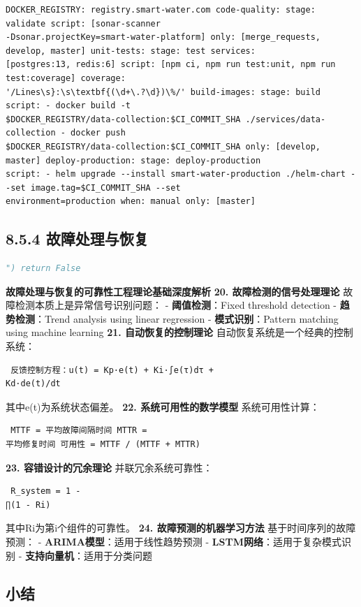 {\begin{lstlisting}
DOCKER_REGISTRY: registry.smart-water.com code-quality: stage: validate script: [sonar-scanner
-Dsonar.projectKey=smart-water-platform] only: [merge_requests, develop, master] unit-tests: stage: test services:
[postgres:13, redis:6] script: [npm ci, npm run test:unit, npm run test:coverage] coverage:
'/Lines\s}:\s\textbf{(\d+\.?\d})\%/' build-images: stage: build script: - docker build -t
$DOCKER_REGISTRY/data-collection:$CI_COMMIT_SHA ./services/data-collection - docker push
$DOCKER_REGISTRY/data-collection:$CI_COMMIT_SHA only: [develop, master] deploy-production: stage: deploy-production
script: - helm upgrade --install smart-water-production ./helm-chart --set image.tag=$CI_COMMIT_SHA --set
environment=production when: manual only: [master] \end{lstlisting} \subsection{8.5.4
故障处理与恢复}\label{ux6545ux969cux5904ux7406ux4e0eux6062ux590d} \begin{lstlisting}[language=Python] ") return False
\end{lstlisting} \textbf{故障处理与恢复的可靠性工程理论基础深度解析} \textbf{20. 故障检测的信号处理理论} 故障检测本质上是异常信号识别问题： - \textbf{阈值检测}：Fixed
threshold detection - \textbf{趋势检测}：Trend analysis using linear regression - \textbf{模式识别}：Pattern matching using
machine learning \textbf{21. 自动恢复的控制理论} 自动恢复系统是一个经典的控制系统： \begin{lstlisting} 反馈控制方程：u(t) = Kp·e(t) + Ki·∫e(τ)dτ +
Kd·de(t)/dt \end{lstlisting} 其中e(t)为系统状态偏差。 \textbf{22. 系统可用性的数学模型} 系统可用性计算： \begin{lstlisting} MTTF = 平均故障间隔时间 MTTR =
平均修复时间 可用性 = MTTF / (MTTF + MTTR) \end{lstlisting} \textbf{23. 容错设计的冗余理论} 并联冗余系统可靠性： \begin{lstlisting} R_system = 1 -
∏(1 - Ri) \end{lstlisting} 其中Ri为第i个组件的可靠性。 \textbf{24. 故障预测的机器学习方法} 基于时间序列的故障预测： - \textbf{ARIMA模型}：适用于线性趋势预测 -
\textbf{LSTM网络}：适用于复杂模式识别 - \textbf{支持向量机}：适用于分类问题 \subsection{小结}\label{ux5c0fux7ed3-2}
}
